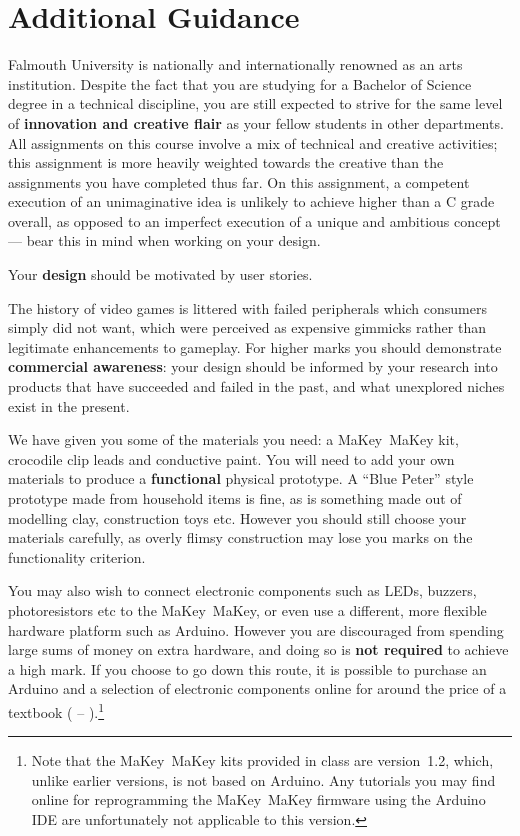 \documentclass{../fal_assignment}
\begin{document}
\section*{Additional Guidance}

Falmouth University is nationally and internationally renowned as an arts institution.
Despite the fact that you are studying for a Bachelor of Science degree in a technical discipline,
you are still expected to strive for the same level of \textbf{innovation and creative flair}
as your fellow students in other departments.
All assignments on this course involve a mix of technical and creative activities;
this assignment is more heavily weighted towards the creative than the assignments you have completed thus far.
On this assignment, a competent execution of an unimaginative idea is unlikely to achieve higher than a C grade overall,
as opposed to an imperfect execution of a unique and ambitious concept
--- bear this in mind when working on your design.

Your \textbf{design} should be motivated by user stories.

The history of video games is littered with failed peripherals which consumers simply did not want,
which were perceived as expensive gimmicks rather than legitimate enhancements to gameplay.
For higher marks you should demonstrate \textbf{commercial awareness}:
your design should be informed by your research into products that have succeeded and failed
in the past, and what unexplored niches exist in the present.

We have given you some of the materials you need: a MaKey~MaKey kit, crocodile clip leads and conductive paint.
You will need to add your own materials to produce a \textbf{functional} physical prototype.
A ``Blue Peter'' style prototype made from household items is fine,
as is something made out of modelling clay, construction toys etc.
However you should still choose your materials carefully, as overly flimsy construction may
lose you marks on the functionality criterion.

You may also wish to connect electronic components such as LEDs, buzzers, photoresistors etc to the MaKey~MaKey,
or even use a different, more flexible hardware platform such as Arduino.
However you are discouraged from spending large sums of money on extra hardware,
and doing so is \textbf{not required} to achieve a high mark.
If you choose to go down this route,
it is possible to purchase an Arduino and a selection of electronic components online for 
around the price of a textbook ( -- ).\footnote{
    Note that the MaKey~MaKey kits provided in class are version~1.2, which, unlike earlier versions, is not based on Arduino.
    Any tutorials you may find online for reprogramming the MaKey~MaKey firmware using the Arduino IDE
    are unfortunately not applicable to this version.
}
\end{document}
